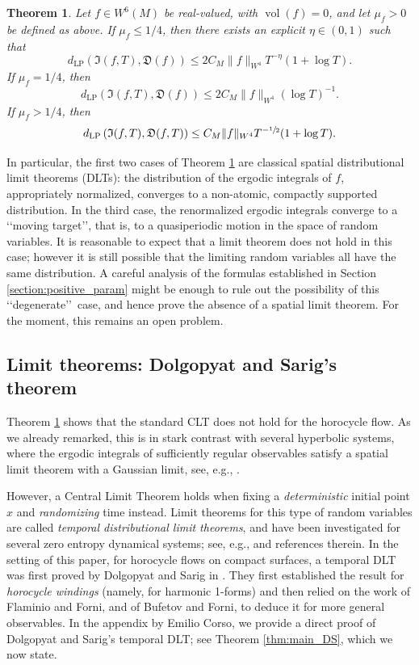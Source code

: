 \documentclass[JEP,XML,SOM,NoEqCountersInSection,Unicode,published]{cedram}
\newcommand{\Levy}{d_{\levyy}}
\DeclareMathOperator{\vol}{vol}
\DeclareMathOperator{\levyy}{LP}
\newtheorem{theorem}{Theorem}
\theoremstyle{definition}
\begin{document}
\begin{theorem}\label{thm:main_BF1}
Let $f \in W^6(M)$ be real-valued, with $\vol(f)=0$, and let $\mu_f >0 $ be defined as above.
If $\mu_f \leq 1/4$, then there exists an explicit $\eta \in (0,1)$ such that
\[
\Levy \left(\mathfrak{I}(f,T), \mathfrak{D}(f) \right) \leq 2C_M \|f\|_{W^4} T^{-\eta}(1+\log T).
\]
If $\mu_f=1/4$, then
\[
\Levy \left(\mathfrak{I}(f,T), \mathfrak{D}(f) \right) \leq 2C_M \|f\|_{W^4}(\log T)^{-1}.
\]
If $\mu_f > 1/4$, then
\[
\Levy \left(\mathfrak{I}(f,T), \mathfrak{D}(f,T) \right) \leq C_M \|f\|_{W^4} T^{-\sfrac{1}{2}}(1+\log T).
\]
\end{theorem}

In particular, the first two cases of Theorem \ref{thm:main_BF1} are classical spatial distributional limit theorems (DLTs): the distribution of the ergodic integrals of $f$, appropriately normalized, converges to a non-atomic, compactly supported distribution.
In the third case, the renormalized ergodic integrals converge to a \lq\lq moving target\rq\rq, that is, to a quasiperiodic motion in the space of random variables.
It is reasonable to expect that a limit theorem does not hold in this case; however it is still possible that the limiting random variables all have the same distribution. A careful analysis of the formulas established in Section \ref{section:positive_param} might be enough to rule out the possibility of this \lq\lq degenerate\rq\rq\ case, and hence prove the absence of a spatial limit theorem. For the moment, this remains an open problem.

\subsection{Limit theorems: Dolgopyat and Sarig's theorem}

Theorem \ref{thm:main_BF1} shows that the standard CLT does not hold for the horocycle flow. As we already remarked, this is in stark contrast with several hyperbolic systems, where the ergodic integrals of sufficiently regular observables satisfy a spatial limit theorem with a Gaussian limit, see, e.g., \cite{Rat:CLT}.

However, a Central Limit Theorem holds when fixing a \emph{deterministic} initial point $x$ and \emph{randomizing} time instead.
Limit theorems for this type of random variables are called \emph{temporal distributional limit theorems}, and have been investigated for several zero entropy dynamical systems; see, e.g., \cite{Bec1, Bec2, ADDS, Dolgopyat-Sarig, PaSo, BrUl} and references therein.
In the setting of this paper, \ie for horocycle flows on compact surfaces, a temporal DLT was first proved by Dolgopyat and Sarig in \cite{Dolgopyat-Sarig}. They first established the result for \emph{horocycle windings} (namely, for harmonic 1-forms) and then relied on the work of Flaminio and Forni, and of Bufetov and Forni, to deduce it for more general observables. In the appendix by Emilio Corso, we provide a direct proof of Dolgopyat and Sarig's temporal DLT; see Theorem \ref{thm:main_DS}, which we now state.
\end{document}
